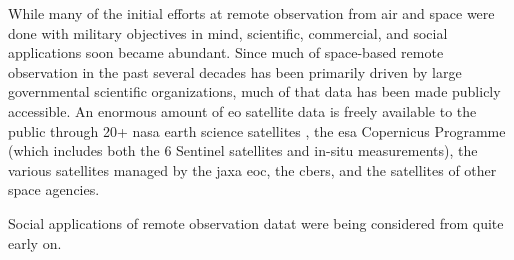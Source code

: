 \documentclass[notitlepage]{article}
\begin{document}
While many of the initial efforts at remote observation from air and space were done with military objectives in mind, scientific, commercial, and social applications soon became abundant. Since much of space-based remote observation in the past several decades has been primarily driven by large governmental scientific organizations, much of that data has been made publicly accessible. An enormous amount of \ac{eo} satellite data is freely available to the public through 20+ \ac{nasa} earth science satellites \cite{shirahNASAEarthObserving2017}, the \ac{esa} Copernicus Programme (which includes both the 6 Sentinel satellites and in-situ measurements), the various satellites managed by the \ac{jaxa} \ac{eoc}, the \ac{cbers}, and the satellites of other space agencies. 
%


Social applications of remote observation datat were being considered from quite early on. 

\end{document}
